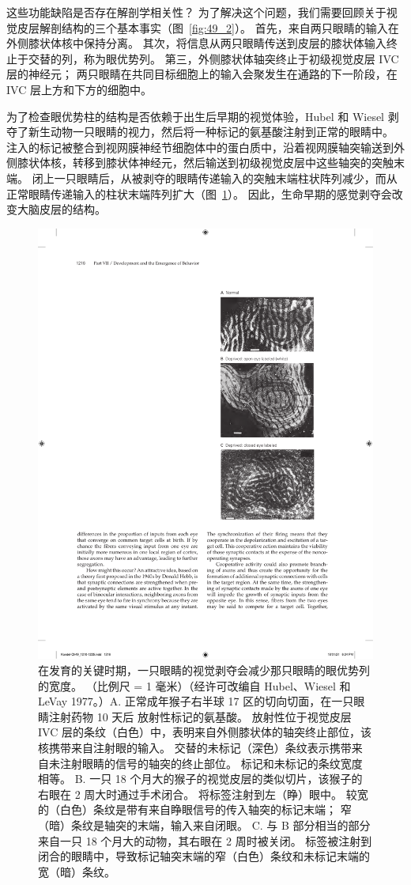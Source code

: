 这些功能缺陷是否存在解剖学相关性？
为了解决这个问题，我们需要回顾关于视觉皮层解剖结构的三个基本事实（图~\ref{fig:49_2}）。
首先，来自两只眼睛的输入在外侧膝状体核中保持分离。
其次，将信息从两只眼睛传送到皮层的膝状体输入终止于交替的列，称为眼优势列。
第三，外侧膝状体轴突终止于初级视觉皮层 IVC 层的神经元；
两只眼睛在共同目标细胞上的输入会聚发生在通路的下一阶段，在 IVC 层上方和下方的细胞中。


为了检查眼优势柱的结构是否依赖于出生后早期的视觉体验，Hubel 和 Wiesel 剥夺了新生动物一只眼睛的视力，然后将一种标记的氨基酸注射到正常的眼睛中。
注入的标记被整合到视网膜神经节细胞体中的蛋白质中，沿着视网膜轴突输送到外侧膝状体核，转移到膝状体神经元，然后输送到初级视觉皮层中这些轴突的突触末端。
闭上一只眼睛后，从被剥夺的眼睛传递输入的突触末端柱状阵列减少，而从正常眼睛传递输入的柱状末端阵列扩大（图~\ref{fig:49_4}）。
因此，生命早期的感觉剥夺会改变大脑皮层的结构。


\begin{figure}[htbp]
	\centering
	\includegraphics[width=0.5\linewidth]{chap49/fig_49_4}
	\caption{在发育的关键时期，一只眼睛的视觉剥夺会减少那只眼睛的眼优势列的宽度。 （比例尺 = 1 毫米）（经许可改编自 Hubel、Wiesel 和 LeVay 1977。）A. 正常成年猴子右半球 17 区的切向切面，在一只眼睛注射药物 10 天后 放射性标记的氨基酸。 放射性位于视觉皮层 IVC 层的条纹（白色）中，表明来自外侧膝状体的轴突终止部位，该核携带来自注射眼的输入。 交替的未标记（深色）条纹表示携带来自未注射眼睛的信号的轴突的终止部位。 标记和未标记的条纹宽度相等。 B. 一只 18 个月大的猴子的视觉皮层的类似切片，该猴子的右眼在 2 周大时通过手术闭合。 将标签注射到左（睁）眼中。 较宽的（白色）条纹是带有来自睁眼信号的传入轴突的标记末端； 窄（暗）条纹是轴突的末端，输入来自闭眼。 C. 与 B 部分相当的部分来自一只 18 个月大的动物，其右眼在 2 周时被关闭。 标签被注射到闭合的眼睛中，导致标记轴突末端的窄（白色）条纹和未标记末端的宽（暗）条纹。}
	\label{fig:49_4}
\end{figure}


